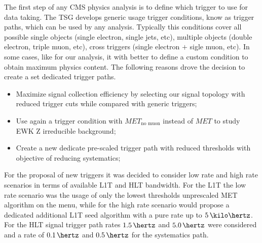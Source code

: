 


The first step of any \gls{CMS} physics analysis is to define which trigger to use for data taking. The \gls{TSG} develops generic usage trigger conditions, know as trigger paths, which can be used by any analysis. Typically this conditions cover all possible single objects (single electron, single jets, etc), multiple objects (double electron, triple muon, etc), cross triggers (single electron $+$ sigle muon, etc). In some cases, like for our analysis, it with better to define a custom condition to obtain maximum physics content. The following reasons drove the decision to create a set dedicated trigger paths.

\begin{itemize}
  \item Maximize signal collection efficiency by selecting our signal topology with reduced trigger cuts while compared with generic triggers;
  \item Use again a trigger condition with $MET_{\text{no muon}}$ instead of $MET$ to study \gls{EWK} Z irreducible background;
  \item Create a new dedicate pre-scaled trigger path with reduced thresholds with objective of reducing systematics;
\end{itemize}

For the proposal of new triggers it was decided to consider low rate and high rate scenarios in terms of available \gls{L1T} and \gls{HLT} bandwidth. For the \gls{L1T} the low rate scenario was the usage of only the lowest thresholds unprescaled \gls{MET} algorithm on the menu, while for the high rate scenario would propose a dedicated additional \gls{L1T} seed algorithm with a pure rate up to $5\,\kilo\hertz$. For the \gls{HLT} signal trigger path rates $1.5\,\hertz$ and $5.0\,\hertz$ were considered and a rate of $0.1\,\hertz$ and $0.5\,\hertz$ for the systematics path.

